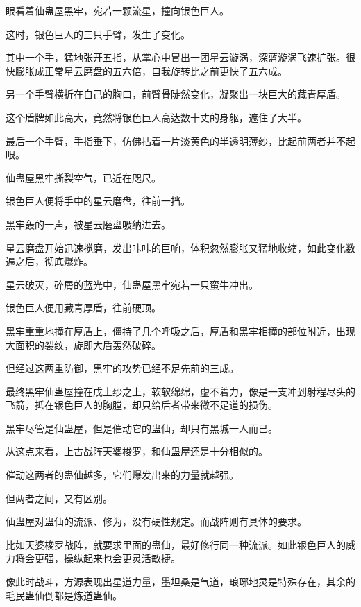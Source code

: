 
\begin{this_body}



眼看着仙蛊屋黑牢，宛若一颗流星，撞向银色巨人。

这时，银色巨人的三只手臂，发生了变化。

其中一个手，猛地张开五指，从掌心中冒出一团星云漩涡，深蓝漩涡飞速扩张。很快膨胀成正常星云磨盘的五六倍，自我旋转比之前更快了五六成。

另一个手臂横折在自己的胸口，前臂骨陡然变化，凝聚出一块巨大的藏青厚盾。

这个盾牌如此高大，竟然将银色巨人高达数十丈的身躯，遮住了大半。

最后一个手臂，手指垂下，仿佛拈着一片淡黄色的半透明薄纱，比起前两者并不起眼。

仙蛊屋黑牢撕裂空气，已近在咫尺。

银色巨人便将手中的星云磨盘，往前一挡。

黑牢轰的一声，被星云磨盘吸纳进去。

星云磨盘开始迅速搅磨，发出咔咔的巨响，体积忽然膨胀又猛地收缩，如此变化数遍之后，彻底爆炸。

星云破灭，碎屑的蓝光中，仙蛊屋黑牢宛若一只蛮牛冲出。

银色巨人便用藏青厚盾，往前硬顶。

黑牢重重地撞在厚盾上，僵持了几个呼吸之后，厚盾和黑牢相撞的部位附近，出现大面积的裂纹，旋即大盾轰然破碎。

但经过这两重防御，黑牢的攻势已经不足先前的三成。

最终黑牢仙蛊屋撞在戊土纱之上，软软绵绵，虚不着力，像是一支冲到射程尽头的飞箭，抵在银色巨人的胸膛，却只给后者带来微不足道的损伤。

黑牢尽管是仙蛊屋，但是催动它的蛊仙，却只有黑城一人而已。

从这点来看，上古战阵天婆梭罗，和仙蛊屋还是十分相似的。

催动这两者的蛊仙越多，它们爆发出来的力量就越强。

但两者之间，又有区别。

仙蛊屋对蛊仙的流派、修为，没有硬性规定。而战阵则有具体的要求。

比如天婆梭罗战阵，就要求里面的蛊仙，最好修行同一种流派。如此银色巨人的威力将会更强，操纵起来也会更灵活敏捷。

像此时战斗，方源表现出星道力量，墨坦桑是气道，琅琊地灵是特殊存在，其余的毛民蛊仙倒都是炼道蛊仙。


\end{this_body}

